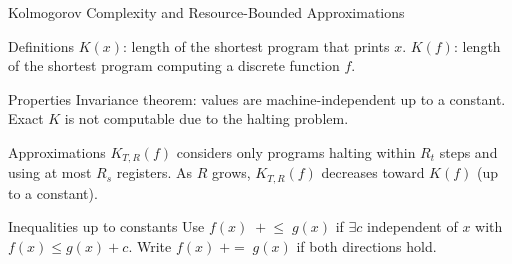 \documentclass{beamer}
\begin{document}
\begin{frame}{Kolmogorov Complexity and Resource-Bounded Approximations}
\small
\begin{block}{Definitions}
$K(x)$: length of the shortest program that prints $x$. 
$K(f)$: length of the shortest program computing a discrete function $f$.
\end{block}

\begin{block}{Properties}
Invariance theorem: values are machine-independent up to a constant. Exact $K$ is not computable due to the halting problem.
\end{block}

\begin{block}{Approximations}
$K_{T,R}(f)$ considers only programs halting within $R_t$ steps and using at most $R_s$ registers. As $R$ grows, $K_{T,R}(f)$ decreases toward $K(f)$ (up to a constant).
\end{block}

\begin{block}{Inequalities up to constants}
Use $f(x)\; {+}\!\le\; g(x)$ if $\exists c$ independent of $x$ with $f(x)\le g(x)+c$. Write $f(x)\;{+=}\;g(x)$ if both directions hold.
\end{block}
\end{frame}
\end{document}
